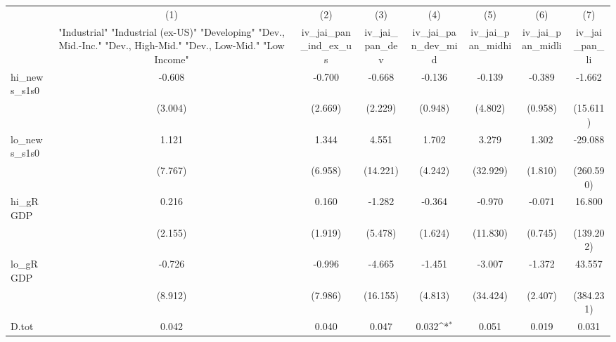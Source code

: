 {
\def\sym#1{\ifmmode^{#1}\else\(^{#1}\)\fi}
\begin{tabular}{l*{7}{c}}
\toprule
            &\multicolumn{1}{c}{(1)}&\multicolumn{1}{c}{(2)}&\multicolumn{1}{c}{(3)}&\multicolumn{1}{c}{(4)}&\multicolumn{1}{c}{(5)}&\multicolumn{1}{c}{(6)}&\multicolumn{1}{c}{(7)}\\
            &\multicolumn{1}{c}{ "Industrial" "Industrial (ex-US)" "Developing" "Dev., Mid.-Inc." "Dev., High-Mid."  "Dev., Low-Mid." "Low Income" }&\multicolumn{1}{c}{iv\_jai\_pan\_ind\_ex\_us}&\multicolumn{1}{c}{iv\_jai\_pan\_dev}&\multicolumn{1}{c}{iv\_jai\_pan\_dev\_mid}&\multicolumn{1}{c}{iv\_jai\_pan\_midhi}&\multicolumn{1}{c}{iv\_jai\_pan\_midli}&\multicolumn{1}{c}{iv\_jai\_pan\_li}\\
\midrule
hi\_news\_s1s0&      -0.608         &      -0.700         &      -0.668         &      -0.136         &      -0.139         &      -0.389         &      -1.662         \\
            &     (3.004)         &     (2.669)         &     (2.229)         &     (0.948)         &     (4.802)         &     (0.958)         &    (15.611)         \\
\addlinespace
lo\_news\_s1s0&       1.121         &       1.344         &       4.551         &       1.702         &       3.279         &       1.302         &     -29.088         \\
            &     (7.767)         &     (6.958)         &    (14.221)         &     (4.242)         &    (32.929)         &     (1.810)         &   (260.590)         \\
\addlinespace
hi\_gRGDP    &       0.216         &       0.160         &      -1.282         &      -0.364         &      -0.970         &      -0.071         &      16.800         \\
            &     (2.155)         &     (1.919)         &     (5.478)         &     (1.624)         &    (11.830)         &     (0.745)         &   (139.202)         \\
\addlinespace
lo\_gRGDP    &      -0.726         &      -0.996         &      -4.665         &      -1.451         &      -3.007         &      -1.372         &      43.557         \\
            &     (8.912)         &     (7.986)         &    (16.155)         &     (4.813)         &    (34.424)         &     (2.407)         &   (384.231)         \\
\addlinespace
D.tot       &       0.042         &       0.040         &       0.047         &       0.032\sym{*}  &       0.051         &       0.019         &       0.031         \\

\end{tabular}}

